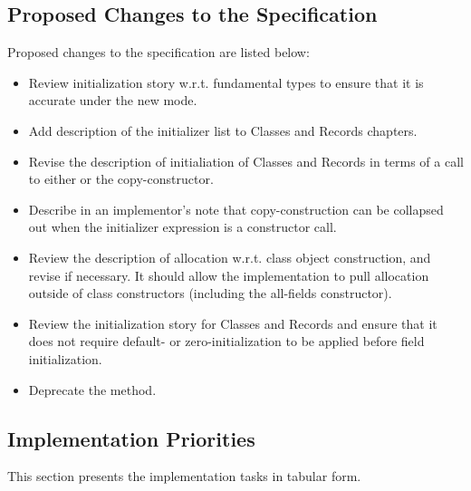 \subsection{Proposed Changes to the Specification}

Proposed changes to the specification are listed below:
\begin{itemize}
\item Review initialization story w.r.t. fundamental types to ensure that it is accurate
  under the new mode.
\item Add description of the initializer list to Classes and Records chapters.
\item Revise the description of initialiation of Classes and Records in terms of a call to
  either  or the copy-constructor.
\item Describe in an implementor's note that copy-construction can be collapsed out when
  the initializer expression is a constructor call.
\item Review the description of allocation w.r.t. class object construction, and revise if
  necessary.  It should allow the implementation to pull allocation outside of class
  constructors (including the all-fields constructor).
\item Review the initialization story for Classes and Records and ensure that it does not
  require default- or zero-initialization to be applied before field initialization.
\item Deprecate the  method.
\end{itemize}

\subsection{Implementation Priorities}

This section presents the implementation tasks in tabular form.

